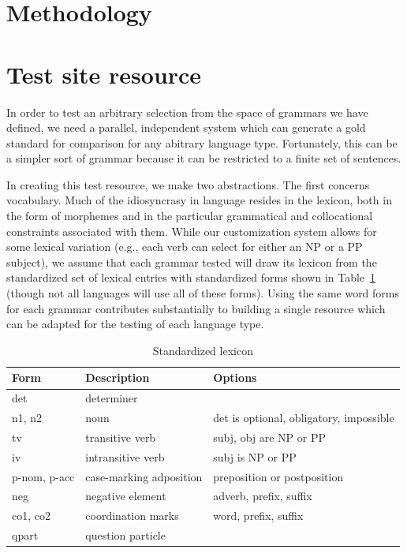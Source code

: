 \documentclass[11pt]{article}
\begin{document}
\section{Methodology}

\section{Test site resource}

In order to test an arbitrary selection from the space of grammars we have
defined, we need a parallel, independent system which can generate a gold
standard for comparison for any abitrary language type.  Fortunately,
this can be a simpler sort of grammar because it can be restricted to a
finite set of sentences.

In creating this test resource, we make two abstractions. The first
concerns vocabulary.  Much of the idiosyncrasy in language resides in
the lexicon, both in the form of morphemes and in the particular
grammatical and collocational constraints associated with them.  While
our customization system allows for some lexical variation (e.g., each
verb can select for either an NP or a PP subject), we assume that
each grammar tested will draw its lexicon from the 
standardized set of lexical entries with standardized forms shown in
Table~\ref{tab1} (though
not all languages will use all of these forms).
Using the same word forms for each grammar contributes substantially
to building a single resource which can be adapted for the testing
of each language type.


\begin{table}[ht]
\begin{center}
\begin{tabular}{|l|l|l|}
\hline
Form & Description & Options \\ \hline \hline
det & determiner & \\ \hline
n1, n2 & noun & det is optional, obligatory, impossible\\
tv & transitive verb & subj, obj are NP or PP\\
iv & intransitive verb & subj is NP or PP\\
p-nom, p-acc & case-marking adposition & preposition or postposition\\
neg & negative element & adverb, prefix, suffix\\
co1, co2 & coordination marks & word, prefix, suffix\\
qpart & question particle & \\
\hline
\end{tabular}
\end{center}
\caption{Standardized lexicon}
\label{tab1}
\end{table}
\end{document}

